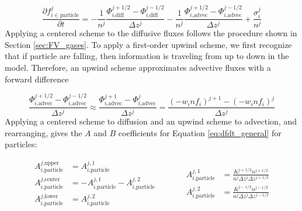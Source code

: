 \begin{equation}
  \frac{\partial f_{i\in\text{particle}}^j}{\partial t} = - \frac{1}{n^{j}} \frac{\Phi_{i\text{,diff}}^{j+1/2} - \Phi_{i\text{,diff}}^{j-1/2}}{\Delta z^j} - \frac{1}{n^{j}} \frac{\Phi_{i\text{,advec}}^{j+1/2} - \Phi_{i\text{,advec}}^{j-1/2}}{\Delta z^j} + \frac{\sigma_i^j}{n^{j}}
\end{equation}
Applying a centered scheme to the diffusive fluxes follows the procedure shown in Section \ref{sec:FV_gases}. To apply a first-order upwind scheme, we first recognize that if particle are falling, then information is traveling from up to down in the model. Therefore, an upwind scheme approximates advective fluxes with a forward difference

\begin{equation}
  \frac{\Phi_{i\text{,advec}}^{j+1/2} - \Phi_{i\text{,advec}}^{j-1/2}}{\Delta z^j} \approx \frac{\Phi_{i\text{,advec}}^{j+1} - \Phi_{i\text{,advec}}^{j}}{\Delta z^j} = \frac{(-w_i n f_i)^{j+1} - (-w_i n f_i)^{j}}{\Delta z^j}
\end{equation}
Applying a centered scheme to diffusion and an upwind scheme to advection, and rearranging, gives the $A$ and $B$ coefficients for Equation \eqref{eq:dfdt_general} for particles:


\begin{equation*}
  \begin{aligned}
    A_{i\text{,particle}}^{j\text{,upper}} &= A_{i\text{,particle}}^{j,1} \\
    A_{i\text{,particle}}^{j\text{,center}} &= - A_{i\text{,particle}}^{j,1} - A_{i\text{,particle}}^{j,2} \\
    A_{i\text{,particle}}^{j\text{,lower}} &= A_{i\text{,particle}}^{j,2}
  \end{aligned}
  \quad\quad\quad
  \begin{aligned}
    A_{i\text{,particle}}^{j,1} &= \frac{K^{j+1/2} n^{j+1/2}}{n^j \Delta z^j \Delta z^{j+1/2}} \\
    A_{i\text{,particle}}^{j,2} &= \frac{K^{j-1/2} n^{j-1/2}}{n^j \Delta z^j \Delta z^{j-1/2}}
  \end{aligned}
\end{equation*}

